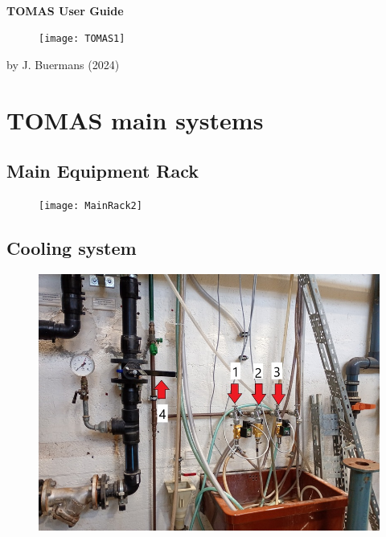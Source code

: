 \documentclass[fleqn,a4paper,20pt]{article}
\begin{document}
\begin{center}
$\ $\\

	
{\Huge \textbf{ TOMAS User Guide}}

\vspace{3.0cm}

\begin{figure}[h!]
	\centering
	\texttt{[image: TOMAS1]}
\end{figure}


\vspace{3.0cm}
\end{center}

\begin{flushright}{by J. Buermans (2024)} \end{flushright}

\newpage
\section{TOMAS main systems}%


\subsection{Main Equipment Rack}

\begin{figure}[h!]
	\centering
	\texttt{[image: MainRack2]}
\end{figure}


\newpage
\subsection{Cooling system}

\begin{figure}[h!]
	\centering
	\includegraphics[width=\linewidth]{Cool2}
\end{figure}
\end{document}
